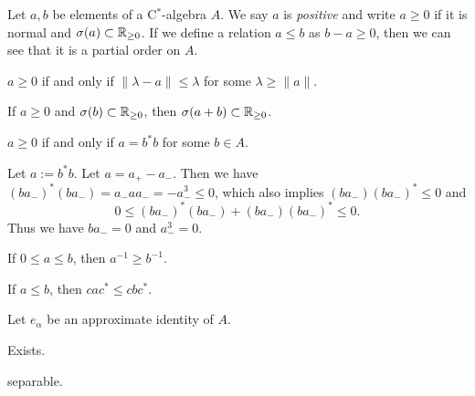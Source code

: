 \documentclass{../../large}
\begin{document}
\begin{prb}
Let $a,b$ be elements of a C$^*$-algebra $A$.
We say $a$ is \emph{positive} and write $a\ge0$ if it is normal and $\sigma(a)\subset\mathbb{R}_{\ge0}$.
If we define a relation $a\le b$ as $b-a\ge0$, then we can see that it is a partial order on $A$.
\begin{parts}
\item $a\ge0$ if and only if $\|\lambda-a\|\le\lambda$ for some $\lambda\ge\|a\|$.
\item If $a\ge0$ and $\sigma(b)\subset\mathbb{R}_{\ge0}$, then $\sigma(a+b)\subset\mathbb{R}_{\ge0}$.
\item $a\ge0$ if and only if $a=b^*b$ for some $b\in A$.
\end{parts}
\end{prb}
\begin{pf}


Let $a:=b^*b$.
Let $a=a_+-a_-$.
Then we have $(ba_-)^*(ba_-)=a_-aa_-=-a_-^3\le0$, which also implies $(ba_-)(ba_-)^*\le0$ and
\[0\le(ba_-)^*(ba_-)+(ba_-)(ba_-)^*\le0.\]
Thus we have $ba_-=0$ and $a_-^3=0$.

\end{pf}




\begin{prb}
\begin{parts}
\item If $0\le a\le b$, then $a^{-1}\ge b^{-1}$.
\item If $a\le b$, then $cac^*\le cbc^*$.
\end{parts}
\end{prb}





\begin{prb}
Let $e_\alpha$ be an approximate identity of $A$.
\begin{parts}
\item Exists.
\item 
\item 
\item separable.
\end{parts}
\end{prb}
\end{document}
